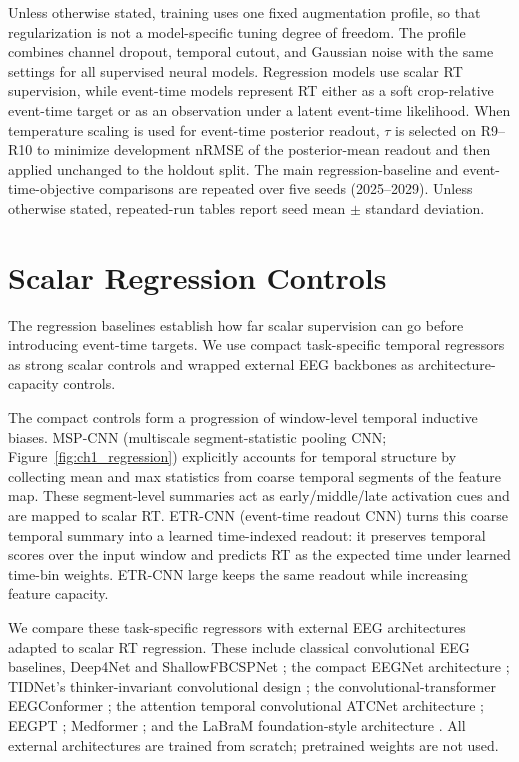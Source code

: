\documentclass[12pt]{article}
\begin{document}
Unless otherwise stated, training uses one fixed augmentation profile, so that regularization is not a model-specific tuning degree of freedom. The profile combines channel dropout, temporal cutout, and Gaussian noise with the same settings for all supervised neural models. Regression models use scalar RT supervision, while event-time models represent RT either as a soft crop-relative event-time target or as an observation under a latent event-time likelihood. When temperature scaling is used for event-time posterior readout, \(\tau\) is selected on R9--R10 to minimize development nRMSE of the posterior-mean readout and then applied unchanged to the holdout split. The main regression-baseline and event-time-objective comparisons are repeated over five seeds (2025--2029). Unless otherwise stated, repeated-run tables report seed mean $\pm$ standard deviation.

\section{Scalar Regression Controls}
\label{sec:baseline_regression}

The regression baselines establish how far scalar supervision can go before introducing event-time targets. We use compact task-specific temporal regressors as strong scalar controls and wrapped external EEG backbones as architecture-capacity controls.

The compact controls form a progression of window-level temporal inductive biases. MSP-CNN (multiscale segment-statistic pooling CNN; Figure~\ref{fig:ch1_regression}) explicitly accounts for temporal structure by collecting mean and max statistics from coarse temporal segments of the feature map. These segment-level summaries act as early/middle/late activation cues and are mapped to scalar RT. ETR-CNN (event-time readout CNN) turns this coarse temporal summary into a learned time-indexed readout: it preserves temporal scores over the input window and predicts RT as the expected time under learned time-bin weights. ETR-CNN large keeps the same readout while increasing feature capacity.

We compare these task-specific regressors with external EEG architectures adapted to scalar RT regression. These include classical convolutional EEG baselines, Deep4Net and ShallowFBCSPNet \citep{braindecode}; the compact EEGNet architecture \citep{lawhern2018eegnet}; TIDNet's thinker-invariant convolutional design \citep{kostas2020thinkerinvariance}; the convolutional-transformer EEGConformer \citep{song2023eegconformer}; the attention temporal convolutional ATCNet architecture \citep{altaheri2022atcnet}; EEGPT \citep{wang2024eegpt}; Medformer \citep{wang2024medformer}; and the LaBraM foundation-style architecture \citep{Jiang2024LaBraM}. All external architectures are trained from scratch; pretrained weights are not used.
\end{document}
